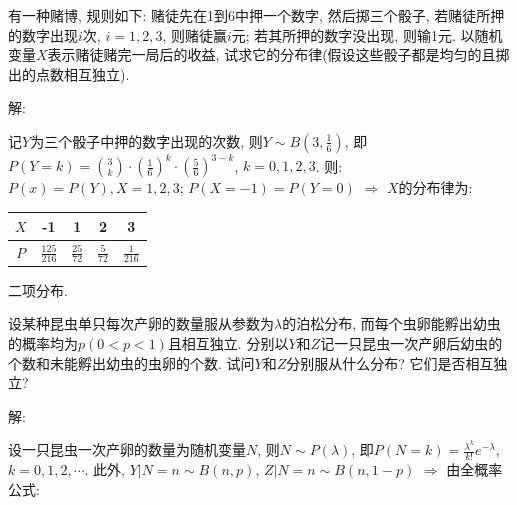 \documentclass[standard]{ExBook}
\begin{document}
\begin{qitems}
    \begin{bbox}
    \begin{shaded}
        \qitem
有一种赌博, 规则如下: 赌徒先在1到6中押一个数字, 然后掷三个骰子, 若赌徒所押的数字出现$i$次, $i=1,2,3$, 则赌徒赢$i$元; 若其所押的数字没出现, 则输1元. 以随机变量$X$表示赌徒赌完一局后的收益, 试求它的分布律(假设这些骰子都是均匀的且掷出的点数相互独立).
    \end{shaded}
    \end{bbox}

\vspace{-5em}

    \begin{bbox}
解: 

记$Y$为三个骰子中押的数字出现的次数, 则$Y\sim B(3,\displaystyle\frac{1}{6})$, 即$P(Y=k)=\binom{3}{k}\cdot(\displaystyle\frac{1}{6})^{k}\cdot(\frac{5}{6})^{3-k}$, $k=0,1,2,3$. 则: $P(x)=P(Y),X=1,2,3$; $P(X=-1)=P(Y=0)$ $\Longrightarrow$ $X$的分布律为:
\begin{center}
\renewcommand{\arraystretch}{1.5}
\setlength{\tabcolsep}{20pt}
\begin{tabular}{c|c|c|c|c}
    \hline
    $X$ & -1 & 1 & 2 & 3 \\
    \hline
    $P$ & $\displaystyle\frac{125}{216}$ & $\displaystyle\frac{25}{72}$ & $\displaystyle\frac{5}{72}$ & $\displaystyle\frac{1}{216}$ \\
    \hline
\end{tabular}
\end{center}
\textcolor{themeColor}{\selectfont {} 二项分布.}
    \end{bbox}

\vspace{-5em}

    \begin{bbox}
    \begin{shaded}
        \qitem
设某种昆虫单只每次产卵的数量服从参数为$\lambda$的泊松分布, 而每个虫卵能孵出幼虫的概率均为$p(0 < p < 1)$且相互独立. 分别以$Y$和$Z$记一只昆虫一次产卵后幼虫的个数和未能孵出幼虫的虫卵的个数. 试问$Y$和$Z$分别服从什么分布? 它们是否相互独立?
    \end{shaded}
    \end{bbox}

\vspace{-5em}

    \begin{bbox}
解: 

设一只昆虫一次产卵的数量为随机变量$N$, 则$N\sim P(\lambda)$, 即$P(N=k)=\displaystyle\frac{\lambda^k}{k!}e^{-\lambda}$, $k=0,1,2,\cdots$. 此外, $Y|N=n\sim B(n,p)$, $Z|N=n\sim B(n,1-p)$ $\Longrightarrow$ 由全概率公式:
    \end{bbox}


\end{qitems}
\end{document}
